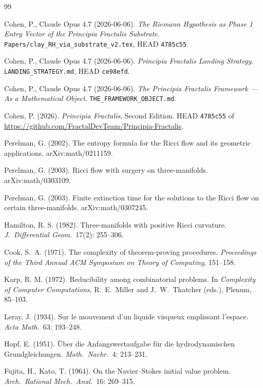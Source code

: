 \documentclass[11pt,a4paper]{article}
\theoremstyle{plain}
\theoremstyle{definition}
\begin{document}
\begin{thebibliography}{99}

Cohen, P., Claude Opus 4.7 (2026-06-06). \emph{The Riemann
Hypothesis as Phase 1 Entry Vector of the Principia Fractalis
Substrate}.
\texttt{Papers/clay\_RH\_via\_substrate\_v2.tex}, HEAD
\texttt{4785c55}.

Cohen, P., Claude Opus 4.7 (2026-06-06). \emph{Principia Fractalis
Landing Strategy}.
\texttt{LANDING\_STRATEGY.md}, HEAD \texttt{ce98efd}.

Cohen, P., Claude Opus 4.7 (2026-06-06). \emph{The Principia Fractalis
Framework --- As a Mathematical Object}.
\texttt{THE\_FRAMEWORK\_OBJECT.md}.

Cohen, P. (2026). \emph{Principia Fractalis}, Second Edition.
HEAD \texttt{4785c55} of
\url{https://github.com/FractalDevTeam/Principia-Fractalis}.

Perelman, G. (2002). The entropy formula for the Ricci flow and its
geometric applications. arXiv:math/0211159.

Perelman, G. (2003). Ricci flow with surgery on three-manifolds.
arXiv:math/0303109.

Perelman, G. (2003). Finite extinction time for the solutions to
the Ricci flow on certain three-manifolds. arXiv:math/0307245.

Hamilton, R. S. (1982). Three-manifolds with positive Ricci
curvature. \emph{J.\ Differential Geom.}\ 17(2): 255--306.

Cook, S.\ A. (1971). The complexity of theorem-proving procedures.
\emph{Proceedings of the Third Annual ACM Symposium on Theory of
Computing}, 151--158.

Karp, R. M. (1972). Reducibility among combinatorial problems.
In \emph{Complexity of Computer Computations}, R.~E.\ Miller and
J.~W.\ Thatcher (eds.), Plenum, 85--103.

Leray, J. (1934). Sur le mouvement d'un liquide visqueux emplissant
l'espace. \emph{Acta Math.}\ 63: 193--248.

Hopf, E. (1951). \"Uber die Anfangswertaufgabe f\"ur die
hydrodynamischen Grundgleichungen.
\emph{Math.\ Nachr.}\ 4: 213--231.

Fujita, H., Kato, T. (1964). On the Navier--Stokes initial value
problem. \emph{Arch.\ Rational Mech.\ Anal.}\ 16: 269--315.


\end{thebibliography}
\end{document}
